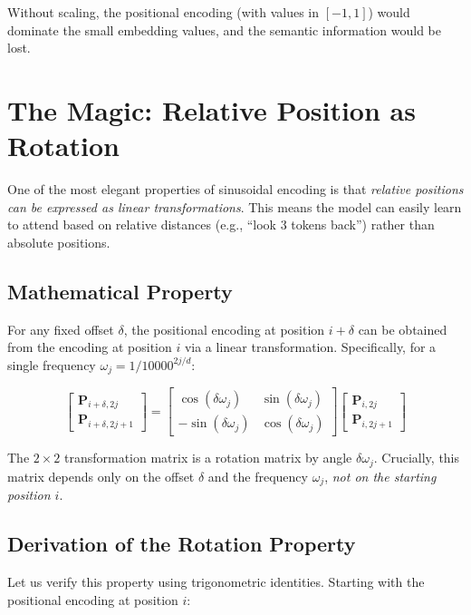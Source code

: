 \documentclass{article}
\begin{document}
Without scaling, the positional encoding (with values in $[-1,1]$) would dominate the small embedding values, and the semantic information would be lost.

\section{The Magic: Relative Position as Rotation}

One of the most elegant properties of sinusoidal encoding is that \emph{relative positions can be expressed as linear transformations}. This means the model can easily learn to attend based on relative distances (e.g., ``look 3 tokens back'') rather than absolute positions.

\subsection{Mathematical Property}

For any fixed offset $\delta$, the positional encoding at position $i + \delta$ can be obtained from the encoding at position $i$ via a linear transformation. Specifically, for a single frequency $\omega_j = 1/10000^{2j/d}$:

\begin{equation}
\begin{bmatrix}
\mathbf{P}_{i+\delta,2j} \\
\mathbf{P}_{i+\delta,2j+1}
\end{bmatrix}
=
\begin{bmatrix}
\cos(\delta \omega_j) & \sin(\delta \omega_j) \\
-\sin(\delta \omega_j) & \cos(\delta \omega_j)
\end{bmatrix}
\begin{bmatrix}
\mathbf{P}_{i,2j} \\
\mathbf{P}_{i,2j+1}
\end{bmatrix}
\end{equation}

The $2 \times 2$ transformation matrix is a rotation matrix by angle $\delta \omega_j$. Crucially, this matrix depends only on the offset $\delta$ and the frequency $\omega_j$, \emph{not on the starting position $i$}.

\subsection{Derivation of the Rotation Property}

Let us verify this property using trigonometric identities. Starting with the positional encoding at position $i$:
\end{document}
